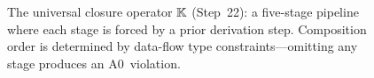 \begin{figure}[ht]
{%
}%
\caption{The universal closure operator $\mathbb{K}$ (Step~22): a five-stage
  pipeline where each stage is forced by a prior derivation step.
  Composition order is determined by data-flow type constraints---omitting
  any stage produces an A0~violation.}
\label{fig:univop-pipeline}
\end{figure}
